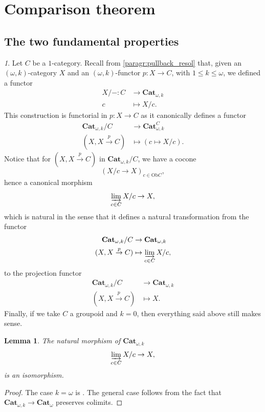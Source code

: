 \documentclass[reqno]{amsart}
\theoremstyle{plain}
\newtheorem{lemma}[subsubsection]{Lemma}
\theoremstyle{definition}
\theoremstyle{remark}
\newtheorem{paragr}[subsubsection]{} %
\newcommand{\pair}[2]{(#1,#2)}       %
\newcommand{\ilim}{\varinjlim} %
\newcommand{\Ob}{\mathrm{Ob}} %
\newcommand{\tr}[2]{#1/#2} %
\newcommand{\ctg}[1]{\mathbf{#1}}  %
\newcommand{\Cat}{\ctg{Cat}}   %
\newcommand{\nCat}[1]{\Cat_{#1}}  %
\newcommand{\opCat}[1]{\Cat_{\omega,#1}} %
\newcommand{\funopCat}[2]{\Cat_{\omega,#1}^{#2}} %
\newcommand{\oCat}{\nCat{\omega}} %
\newcommand{\oo}{\ensuremath{\omega}}
\newcommand{\ook}[1]{\ensuremath{\pair{\omega}{#1}}}
\newcommand{\nbd}{\nobreakdash} %
\begin{document}
\section{Comparison theorem}\label{sec:comparison}

\subsection{The two fundamental properties}
\begin{paragr}\label{paragr:colimtr}
  Let $C$ be a $1$\nbd-category. Recall from \ref{paragr:pullback_resol} that, given an $\ook
  k$\nbd-category
  $X$ and an $\ook k$\nbd-functor $p \colon X \to C$, with $1 \leq k \leq \oo$, we defined a functor
    \[
    \begin{aligned}
      \tr{X}{-} \colon C &\to \opCat{k} \\
      c &\mapsto \tr{X}{c}.
    \end{aligned}
  \]
    This
    construction is functorial in $p\colon X \to C$ as it canonically defines a functor
  \begin{align*}
    \tr{\opCat{k}}{C} &\to \funopCat{k}{C}\\
    (X, X \overset{p}{\to} C) &\mapsto \left(c \mapsto \tr{X}{c}\right).
  \end{align*}
  Notice that for $(X, X \overset{p}{\to} C)$ in $\tr{\opCat{k}}{C}$,
  we have a cocone
  \[
    (\tr{X}{c} \to X)_{c \in \Ob{C}},
  \]
  hence
  a canonical morphism
  \[
    \ilim_{c \in C}\tr{X}{c} \to X,
  \]
  which is natural in the sense that it defines a natural
  transformation from the functor
  \begin{align*}
    \tr{\opCat{k}}{C} &\to \opCat{k}\\
    (X, X \overset{p}{\to} C) &\mapsto \ilim_{c \in C} \tr{X}{c},
  \end{align*}
  to the projection functor
    \begin{align*}
    \tr{\opCat{k}}{C} &\to \opCat{k}\\
    (X, X \overset{p}{\to} C) &\mapsto X.
    \end{align*}
    Finally, if we take $C$ a groupoid and $k=0$, then everything said
    above still makes sense.
\end{paragr}
\begin{lemma}\label{lemma:colim}
  The natural morphism of $\opCat{k}$
  \[
     \ilim_{c \in C}\tr{X}{c} \to X,
   \]
   is an isomorphism.
\end{lemma}
\begin{proof}
The case $k=\oo$ is \cite[Lemma 7.5]{guetta:homcat}. The general case
follows from the fact that $\opCat{k} \to \oCat$
  preserves colimits.
\end{proof}
\end{document}
